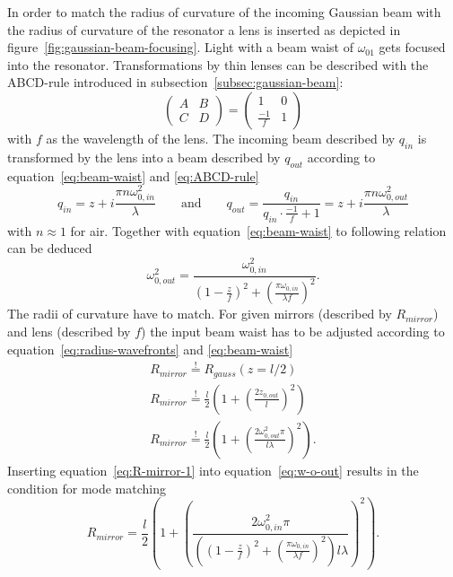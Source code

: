 In order to match the radius of curvature of the incoming Gaussian beam with the radius of curvature of the resonator a lens is inserted as depicted in figure~\ref{fig:gaussian-beam-focusing}. Light with a beam waist of $\omega_{01}$ gets focused into the resonator. Transformations by thin lenses can be described with the ABCD-rule introduced in subsection~\ref{subsec:gaussian-beam}:
\begin{equation}
\begin{pmatrix}
A & B \\
C & D
\end{pmatrix}
=
\begin{pmatrix}
1 & 0 \\
\frac{-1}{f} & 1
\end{pmatrix}
\end{equation}
with $f$ as the wavelength of the lens.
The incoming beam described by $q_{in}$ is transformed by the lens into a beam described by $q_{out}$ according to equation~\eqref{eq:beam-waist} and \eqref{eq:ABCD-rule}
\begin{equation}
q_{in} = z + i \frac{\pi n \omega_{0,in}^2}{\lambda} \qquad \mathrm{and} \qquad
q_{out} = \frac{q_{in}}{q_{in} \cdot \frac{-1}{f} + 1} =  z + i \frac{\pi n \omega_{0,out}^2}{\lambda}
\end{equation}
with $n\approx 1$ for air. Together with equation~\eqref{eq:beam-waist} to following relation can be deduced
\begin{equation}
\label{eq:w-o-out}
\omega_{0,out}^2 = \frac{\omega_{0,in}^2}{\left(1-\frac{z}{f}\right)^2+\left(\frac{\pi \omega_{0,in}}{\lambda f}\right)^2}.
\end{equation}
The radii of curvature have to match.
For given mirrors (described by $R_{mirror}$) and lens (described by $f$) the input beam waist has to be adjusted according to equation~\eqref{eq:radius-wavefronts} and \eqref{eq:beam-waist}
\begin{align}
R_{mirror} \stackrel{!}{=} R_{gauss}(z= l/2)\\
R_{mirror} \stackrel{!}{=} \frac{l}{2} \left(1+\left(\frac{2z_{0,out}}{l}\right)^2\right) \\
\label{eq:R-mirror-1}
R_{mirror} \stackrel{!}{=} \frac{l}{2} \left(1+\left(\frac{2\omega_{0,out}^2 \pi}{l \lambda}\right)^2\right).
\end{align}
Inserting equation~\eqref{eq:R-mirror-1} into equation~\eqref{eq:w-o-out} results in the condition for mode matching
\begin{equation}
\label{eq:R-mirror-2}
R_{mirror} = \frac{l}{2} \left(1+\left(\frac{2 \omega_{0,in}^2 \pi}{\left(\left(1-\frac{z}{f}\right)^2+\left(\frac{\pi \omega_{0,in}}{\lambda f}\right)^2\right)l \lambda}\right)^2\right).
\end{equation}

